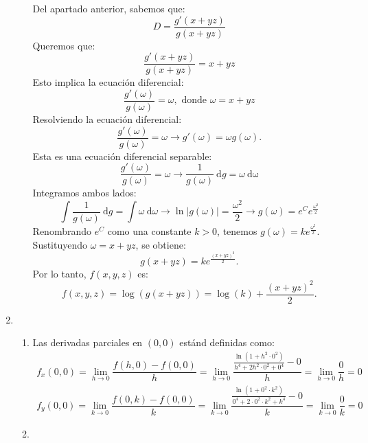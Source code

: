 \begin{enumerate}[label=\color{red}\textbf{\arabic*)}, leftmargin=*]
\begin{enumerate}[label=\color{red}\textbf{\alph*)}]
Del apartado anterior, sabemos que: $$
D=\dfrac{g'(x+yz)}{g(x+yz)}
$$Queremos que: $$
\dfrac{g'(x+yz)}{g(x+yz)}=x+yz
$$Esto implica la ecuación diferencial:$$
\dfrac{g'(\omega)}{g(\omega)}=\omega,\text{ donde }\omega=x+yz
$$
Resolviendo la ecuación diferencial: $$
\dfrac{g'(\omega)}{g(\omega)}=\omega\longrightarrow g'(\omega)=\omega g(\omega).
$$Esta es una ecuación diferencial separable:$$
\dfrac{g'(\omega)}{g(\omega)}=\omega\longrightarrow \dfrac{1}{g(\omega)}\:\mathrm{d}g=\omega \:\mathrm{d\omega}
$$Integramos ambos lados:$$
\int \dfrac{1}{g(\omega)}\:\mathrm{d}g=\int \omega\:\mathrm{d}\omega\longrightarrow \ln|g(\omega)|=\dfrac{\omega^{2}}{2}\longrightarrow g(\omega)=e^{ C }e^{ \frac{\omega^{2}}{2} }
$$
Renombrando $e^{ C }$ como una constante $k>0$, tenemos $g(\omega)=ke^{ \frac{\omega^{2}}{2} }$. Sustituyendo $\omega=x+yz$, se obtiene: $$
g(x+yz)=ke^{ \frac{(x+yz)^{2}}{2} }.
$$Por lo tanto, $f(x,y,z)$ es: $$
f(x,y,z)=\log(g(x+yz))=\log(k)+\dfrac{(x+yz)^{2}}{2}.
$$
\end{enumerate}
\item {}
\begin{enumerate}[label=\color{red}\textbf{\alph*)}]
\item {}

Las derivadas parciales en $(0,0)$ estánd definidas como: $$
\begin{array}{l}
f_{x}(0,0)=\lim_{ h \to 0 }\dfrac{f(h,0)-f(0,0)}{h}=\lim_{ h \to 0 }\dfrac{\frac{\ln(1+h^{2}\cdot 0^{2})}{h^4+2h^{2}\cdot 0^{2}+0^4}-0}{h}=\lim_{ h \to 0 }\dfrac{0}{h}=0 \\
f_{y}(0,0)=\lim_{ k \to 0 }\dfrac{f(0,k)-f(0,0)}{k}=\lim_{ k \to 0 }\dfrac{\frac{\ln(1+0^{2}\cdot k^{2})}{0^4+2\cdot 0^{2}\cdot k^{2}+k^4}-0}{k}=\lim_{ k \to 0 }\dfrac{0}{k}=0
\end{array}
$$

\item {}


\end{enumerate}
\end{enumerate}
